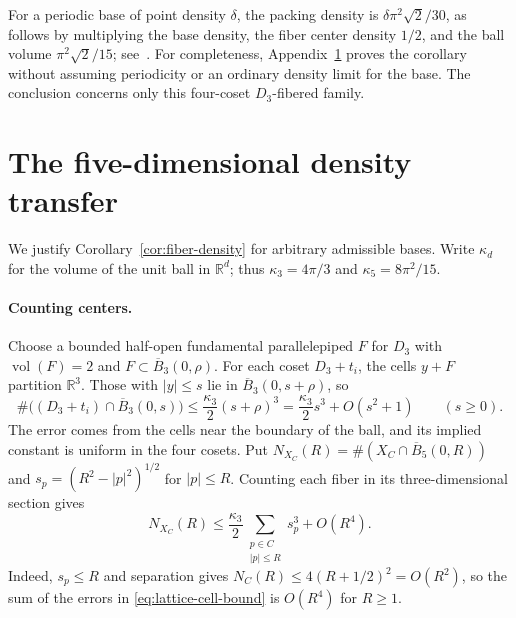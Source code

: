 \documentclass[11pt,a4paper]{article}
\theoremstyle{definition}
\theoremstyle{remark}
\newcommand{\R}{\mathbb{R}}
\DeclareMathOperator{\vol}{vol}
\begin{document}
For a periodic base of point density $\delta$, the packing density is
$\delta\pi^2\sqrt2/30$, as follows by multiplying the base density,
the fiber center density $1/2$, and the ball volume
$\pi^2\sqrt2/15$; see~\cite[Section~4.1]{CR}.
For completeness, Appendix~\ref{app:density} proves the corollary
without assuming periodicity or an ordinary density limit for the base.
The conclusion concerns only this four-coset $D_3$-fibered family.

\appendix

\section{The five-dimensional density transfer}
\label{app:density}

We justify Corollary~\ref{cor:fiber-density} for arbitrary admissible
bases. Write $\kappa_d$ for the volume of the unit ball in $\R^d$;
thus $\kappa_3=4\pi/3$ and $\kappa_5=8\pi^2/15$.

\paragraph{Counting centers.}
Choose a bounded half-open fundamental parallelepiped $F$ for $D_3$
with $\vol(F)=2$ and $F\subset\overline B_3(0,\rho)$.
For each coset $D_3+t_i$, the cells $y+F$ partition $\R^3$.
Those with $|y|\leq s$ lie in $\overline B_3(0,s+\rho)$, so
\begin{equation}
\label{eq:lattice-cell-bound}
\#\bigl((D_3+t_i)\cap\overline B_3(0,s)\bigr)
\leq\frac{\kappa_3}{2}(s+\rho)^3
=\frac{\kappa_3}{2}s^3+O(s^2+1)
\qquad(s\geq0).
\end{equation}
The error comes from the cells near the boundary of the ball, and its
implied constant is uniform in the four cosets.
Put $N_{X_C}(R)=\#(X_C\cap\overline B_5(0,R))$ and
$s_p=(R^2-|p|^2)^{1/2}$ for $|p|\leq R$.
Counting each fiber in its three-dimensional section gives
\begin{equation}
\label{eq:fiber-count}
N_{X_C}(R)
\leq\frac{\kappa_3}{2}
\sum_{\substack{p\in C\\|p|\leq R}}s_p^3+O(R^4).
\end{equation}
Indeed, $s_p\leq R$ and separation gives
$N_C(R)\leq4(R+1/2)^2=O(R^2)$, so the sum of the errors in
\eqref{eq:lattice-cell-bound} is $O(R^4)$ for $R\geq1$.
\end{document}
